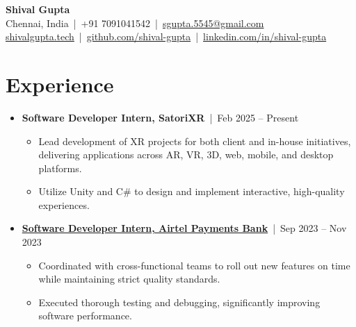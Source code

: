 \documentclass[a4paper,10pt]{article}
\newcommand{\subsectionbreak}{\vspace{0em}}
\begin{document}
\begin{center}
    {\fontsize{24pt}{28pt}\selectfont \textbf{Shival Gupta}} \\
    \vspace{0.2cm}
    \small Chennai, India \,|\, +91 7091041542 \,|\, \href{mailto:sgupta.5545@gmail.com}{\textcolor{accentcolor}{sgupta.5545@gmail.com}} \\
    \href{https://shivalgupta.tech/}{\textcolor{accentcolor}{shivalgupta.tech}} \,|\, \href{https://github.com/shival-gupta/}{\textcolor{accentcolor}{github.com/shival-gupta}} \,|\, \href{https://linkedin.com/in/shival-gupta/}{\textcolor{accentcolor}{linkedin.com/in/shival-gupta}}
\end{center}

\vspace{-0.3cm}

\section{Experience}
\begin{itemize}[noitemsep, topsep=0pt]
    \item \textbf{Software Developer Intern, SatoriXR} \,|\, Feb 2025 – Present
        \subsectionbreak
        \begin{itemize}
            \item Lead development of XR projects for both client and in-house initiatives, delivering applications across AR, VR, 3D, web, mobile, and desktop platforms.
            \item Utilize Unity and C\# to design and implement interactive, high-quality experiences.
        \end{itemize}
        \subsectionbreak
    \item \href{https://drive.google.com/file/d/1zCj8CKZbHcKEj6LS8N3VzG33aIENUIZA/view?usp=sharing}{\textcolor{accentcolor}{\textbf{Software Developer Intern, Airtel Payments Bank}}} \,|\, Sep 2023 – Nov 2023
        \subsectionbreak
        \begin{itemize}
            \item Coordinated with cross-functional teams to roll out new features on time while maintaining strict quality standards.
            \item Executed thorough testing and debugging, significantly improving software performance.
        \end{itemize}
\end{itemize}
\end{document}
